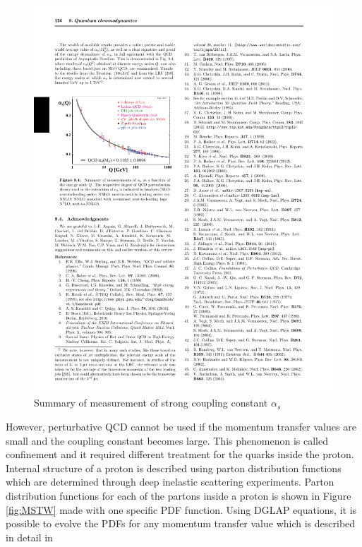 \begin{figure}[htbp]
	\centering
		\includegraphics{Figures/alpha_s.pdf}
	\caption[Strong force coupling constant]{Summary of measurement of strong coupling constant $\alpha_s$\citep{Agashe:2014kda} }
	\label{fig:alpha_s}
\end{figure}

	However, perturbative QCD cannot be used if the momentum transfer values are small and the coupling constant becomes large. This phenomenon is called confinement and it required different treatment for the quarks inside the proton. Internal structure of a proton is described using parton distribution functions which are determined through deep inelastic scattering experiments. Parton distribution functions for each of the partons inside a proton is shown in Figure \ref{fig:MSTW} made with one specific PDF function. Using DGLAP equations, it is possible to evolve the PDFs for any momentum transfer value which is described in detail in \citep{Campbell:2006wx} 

